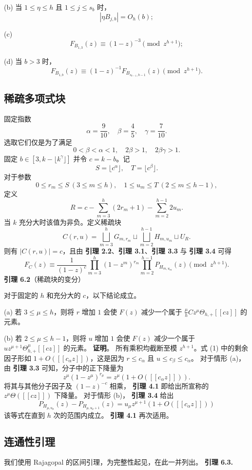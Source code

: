 \documentclass[11pt]{article}
\theoremstyle{break}
\begin{document}
(b) 当 $1 \le \eta \le h$ 且 $1 \le j \le s_b$ 时，
\[ |\eta B_{j,b}| = O_h(b); \]

(c)
\[ F_{B_{1,3}}(z) \equiv (1-z)^{-3} \pmod{z^{h+1}}; \]

(d) 当 $b > 3$ 时，
\[ F_{B_{1,b}}(z) \equiv (1-z)^{-1} F_{B_{s_{b-1},b-1}}(z) \pmod{z^{h+1}}. \]
\subsection{稀疏多项式块}
固定指数
\[
\alpha = \frac{9}{10}, \quad \beta = \frac{4}{5}, \quad \gamma = \frac{7}{10}.
\]
选取它们仅是为了满足
\[
0 < \beta < \alpha < 1, \quad 2\beta > 1, \quad 2\beta\gamma > 1.
\]
固定 $b \in [3, k-\lfloor k^\gamma \rfloor]$ 并令 $c = k-b$。记
\[
S = \lfloor c^\alpha \rfloor, \quad T = \lfloor c^\beta \rfloor.
\]
对于参数
\[
0 \le r_m \le S \ (3 \le m \le h), \quad 1 \le u_m \le T \ (2 \le m \le h-1),
\]
定义
\[
R = c - \sum_{m=3}^h (2r_m + 1) - \sum_{m=2}^{h-1} 2u_m.
\]
当 $k$ 充分大时该值为非负。定义稀疏块
\[
C(r,u) = \bigsqcup_{m=3}^h G_{m,r_m} \sqcup \bigsqcup_{m=2}^{h-1} H_{m,u_m} \sqcup U_R.
\]
则有 $|C(r,u)| = c$，且由
\textbf{引理 2.2}、\textbf{引理 3.1}、\textbf{引理 3.3} 与 \textbf{引理 3.4}
可得
\[
F_C(z) \equiv \frac{1}{(1-z)^c} \prod_{m=3}^h (1-z^m)^{r_m} \prod_{m=2}^{h-1} P_{H_{m,u_m}}(z) \pmod{z^{h+1}}. \tag{1}
\]
\textbf{引理 6.2}（稀疏块的变分）

对于固定的 $h$ 和充分大的 $c$，以下结论成立。

(a) 若 $3 \le \mu \le h$，则将 $r$ 增加 $1$ 会使 $F(z)$ 减少一个属于 $\frac{\mu}{h} C z^\mu \Theta_{h,+}[[cz]]$ 的元素。

(b) 若 $2 \le \mu \le h-1$，则将 $u$ 增加 $1$ 会使 $F(z)$ 减少一个属于 $u z^{\mu+1} \Theta_{h,+}^\mu [[cz]]$ 的元素。
\textbf{证明}。
所有乘积均截断至模 $z^{h+1}$。式 (1) 中的剩余因子形如 $1 + O([[c_\alpha z]])$，这是因为 $r \le c_\alpha$ 且 $u \le c_\beta \le c_\alpha$。
对于情形 (a)，由
\textbf{引理 3.3}
可知，分子中的正下降量为
\[ z^\mu (1 - z^\mu)^{r_\mu} = z^\mu (1 + O([[c_\alpha z]])). \]
将其与其他分子因子及 $(1-z)^{-c}$ 相乘，
\textbf{引理 4.1}
即给出所宣称的 $z^\mu \Theta([[c z]])$ 下降量。
对于情形 (b)，
\textbf{引理 3.4}
给出
\[ P_{H_{\mu, u_\mu}}(z) - P_{H_{\mu, u_\mu+1}}(z) = u_\mu z^{\mu+1} (1 + O([[c_\alpha z]])) \]
该等式在直到 $h$ 次的范围内成立。
\textbf{引理 4.1}
再次适用。
\subsection{连通性引理}
我们使用 Rajagopal 的区间引理，为完整性起见，在此一并列出。
\textbf{引理 6.3.}
\end{document}
